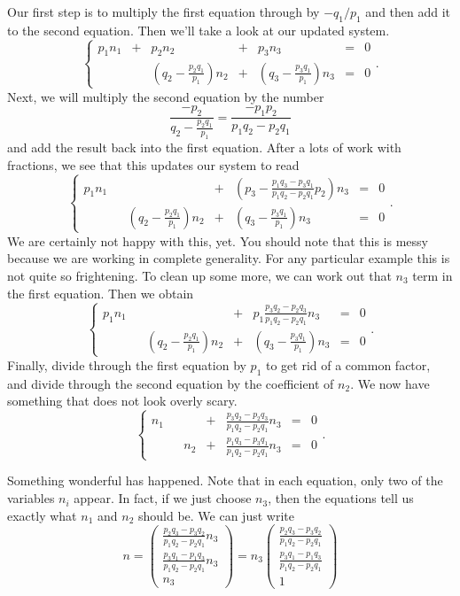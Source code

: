 \documentclass[00-livre-main.tex]{subfiles}
\begin{document}
Our first step is to multiply the first equation through by $-q_1/p_1$ and then add it to the second equation. Then we'll take a look at our updated system.
\[
\left\{ \begin{array}{rrrrrrr}
p_1 n_1 & + & p_2 n_2 & + & p_3 n_3 & = & 0 \\
& &\left(q_2-\frac{p_2q_1}{p_1}\right) n_2 & + & \left(q_3-\frac{p_3q_1}{p_1}\right) n_3 & = & 0 
\end{array}\right. .
\]
Next, we will multiply the second equation by the number 
\[
\frac{-p_2}{q_2 - \frac{p_2q_1}{p_1}} = \frac{-p_1p_2}{p_1q_2 - p_2q_1}
\] 
and add the result back into the first equation. After a lots of work with fractions, we see that this updates our system to read
\[
\left\{ \begin{array}{rrrrrrr}
p_1 n_1 &  &  & + & \left(p_3 -\frac{p_1q_3-p_3q_1}{p_1q_2 - p_2q_1}p_2  \right) n_3 & = & 0 \\
& &\left(q_2-\frac{p_2q_1}{p_1}\right) n_2 & + & \left(q_3-\frac{p_3q_1}{p_1}\right) n_3 & = & 0 
\end{array}\right. .
\]
We are certainly not happy with this, yet. You should note that this is messy because we are working in complete generality. For any particular example this is not quite so frightening. To clean up some more, we can work out that $n_3$ term in the first equation. Then we obtain
\[
\left\{ \begin{array}{rrrrrrr}
p_1 n_1 &  &  & + & p_1\frac{p_3q_2 - p_2q_3}{p_1q_2-p_2q_1} n_3 & = & 0 \\
& &\left(q_2-\frac{p_2q_1}{p_1}\right) n_2 & + & \left(q_3-\frac{p_3q_1}{p_1}\right) n_3 & = & 0
\end{array}\right. .
\]
Finally, divide through the first equation by $p_1$ to get rid of a common factor, and  divide through the second equation by the coefficient of $n_2$. We now have something that does not look overly scary.
\[
\left\{ \begin{array}{rrrrrrr}
n_1 &  &  & + & \frac{p_3q_2 - p_2q_3}{p_1q_2-p_2q_1} n_3 & = & 0 \\
& & n_2 & + & \frac{p_1q_3-p_3q_1}{p_1q_2-p_2q_1} n_3 & = & 0 
\end{array}\right. .
\]



Something wonderful has happened. Note that in each equation, only two of the variables $n_i$ appear. In fact, if we just choose $n_3$, then the equations tell us exactly what $n_1$ and $n_2$ should be. We can just write
\[
n = \begin{pmatrix}  \frac{p_2q_3 - p_3q_2}{p_1q_2-p_2q_1} n_3\\ \frac{p_3q_1-p_1q_3}{p_1q_2-p_2q_1} n_3\\ n_3 \end{pmatrix} = n_3 \begin{pmatrix}  \frac{p_2q_3 - p_3q_2}{p_1q_2-p_2q_1} \\ \frac{p_3q_1-p_1q_3}{p_1q_2-p_2q_1} \\ 1 \end{pmatrix}
\]
\end{document}
